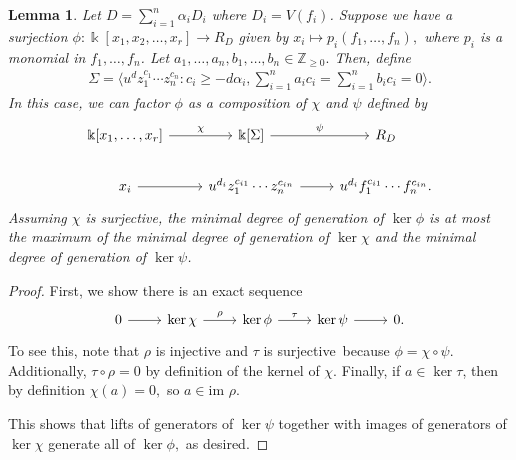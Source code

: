 \documentclass{amsart}
\theoremstyle{plain}
\newtheorem{lem}[thm]{Lemma}
\theoremstyle{definition}
\theoremstyle{remark}
\numberwithin{equation}{section}
\newcommand\bz{{\mathbb Z}}
\newcommand\bk{{\Bbbk}}
\newcommand\im{\text{im }}
\newcommand\bida{a}
\newcommand\bidb{b}
\begin{document}
\begin{lem}
\label{lem:composite-map}
Let $D = \sum_{i=1}^{n}\alpha_i D_i$ where $D_i = V(f_i)$. Suppose we have a
surjection $\phi: \bk[x_1,x_2,\ldots, x_r] \rightarrow R_D$ given by $x_i
\mapsto p_i(f_1, \ldots, f_n),$ where $p_i$ is a monomial in $f_1,\ldots, f_n$.
Let $\bida_1, \ldots, \bida_n, \bidb_1, \ldots, \bidb_n \in \bz_{\geq 0}.$
Then, define
\begin{align*}
	\Sigma = \langle u^d z_1^{c_1} \cdots z_n^{c_n} : c_i \geq -d \alpha_i, \sum_{i=1}^{n} \bida_i c_i = \sum_{i=1}^{n} \bidb_i c_i = 0 \rangle. 
\end{align*}
In this case, we can factor $\phi$ as a composition of $\chi$ and $\psi$ defined by
\[
\begin{tikzcd}
\bk[x_1,\ldots, x_r] \ar {r}{\chi} & \bk[\Sigma] \ar {r}{\psi} & R_D \\
x_i \ar r & u^{d_i}z_1^{c_{i1}} \cdots z_n^{c_{in}} \ar r & u^{d_i}f_1^{c_{i1}} \cdots f_n^{c_{in}}.
\end{tikzcd}
\]
Assuming $\chi$ is surjective, the minimal degree of generation of $\ker \phi$
is at most the maximum of the minimal degree of generation of $\ker \chi$ and
the minimal degree of generation of $\ker \psi$.
\end{lem}
\begin{proof}
First, we show there is an exact sequence
\[
\begin{tikzcd}
0 \ar {r} & \ker \chi \ar{r}{\rho} & \ker \phi \ar {r}{\tau} & \ker \psi \ar r & 0.
\end{tikzcd}
\]
To see this, note that $\rho$ is injective and $\tau$ is surjective\ because
$\phi = \chi \circ \psi$. Additionally, $\tau \circ \rho = 0$ by definition of
the kernel of $\chi$. Finally, if $a \in\ker \tau$, then by definition $\chi(a)
= 0,$ so $a \in \im \rho$.

This shows that lifts of generators of $\ker \psi$ together with images of
generators of $\ker \chi$ generate all of $\ker \phi,$ as desired. 
\end{proof}
\end{document}

